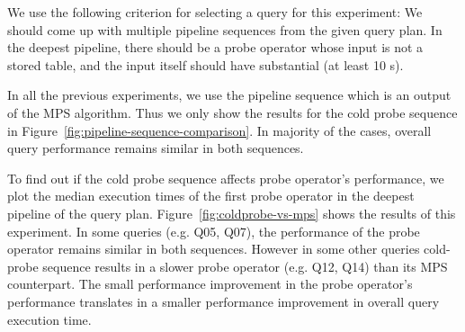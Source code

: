 We use the following criterion for selecting a query for this experiment:
We should come up with multiple pipeline sequences from the given query plan.
In the deepest pipeline, there should be a probe operator whose input is not a stored table, and the input itself should have substantial (at least 10 \wo{}s). 

In all the previous experiments, we use the pipeline sequence which is an output of the MPS algorithm. 
Thus we only show the results for the cold probe sequence in Figure~\ref{fig:pipeline-sequence-comparison}. 
In majority of the cases, overall query performance remains similar in both sequences.

To find out if the cold probe sequence affects probe operator's performance, we plot the median execution times of the first probe operator in the deepest pipeline of the query plan. 
Figure~\ref{fig:coldprobe-vs-mps} shows the results of this experiment. 
In some queries (e.g. Q05, Q07), the performance of the probe operator remains similar in both sequences. 
However in some other queries cold-probe sequence results in a slower probe operator (e.g. Q12, Q14) than its MPS counterpart. 
The small performance improvement in the probe operator's performance translates in a smaller performance improvement in overall query execution time.

